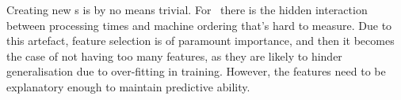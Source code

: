 \documentclass[smallextended]{svjour3}
\begin{document}
Creating new \dr s is by no means trivial. For \jsp\ there is 
the hidden interaction between processing times and machine ordering that's 
hard to measure.
Due to this artefact, feature selection is of paramount importance, and then it 
becomes the case of not having too many features, as they are likely to hinder 
generalisation due to over-fitting in training. However, the features need to 
be explanatory enough to maintain predictive ability. 
\end{document}
